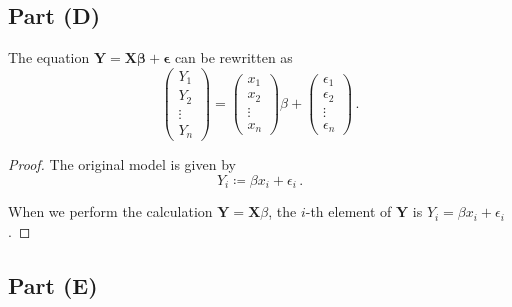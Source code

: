 \documentclass[
]{article}
\begin{document}
\hypertarget{part-d}{%
\subsection{Part (D)}\label{part-d}}


The equation
\(\mathbf{Y} = \mathbf{X} \mathbf{\beta }+ \mathbf{\epsilon}\) can be
rewritten as \begin{equation}
   \begin{pmatrix}
       Y_1\\
       Y_2\\
       \vdots\\
       Y_n
   \end{pmatrix}
   =
   \begin{pmatrix}
       x_1\\
       x_2\\
       \vdots\\
       x_n
   \end{pmatrix}
   \beta
   +
   \begin{pmatrix}
       \epsilon_1\\
       \epsilon_2\\
       \vdots\\
       \epsilon_n
   \end{pmatrix}\,.
\end{equation}

\begin{proof}
The original model is given by
$$
   Y_i \coloneqq \beta x_i + \epsilon_i\,.
$$

When we perform the calculation $\mathbf{Y} = \mathbf{X} \beta$, the $i$-th element of
$\mathbf{Y}$ is $Y_i = \beta x_i + \epsilon_i$.
\end{proof}

\hypertarget{part-e}{%
\subsection{Part (E)}\label{part-e}}

\end{document}
